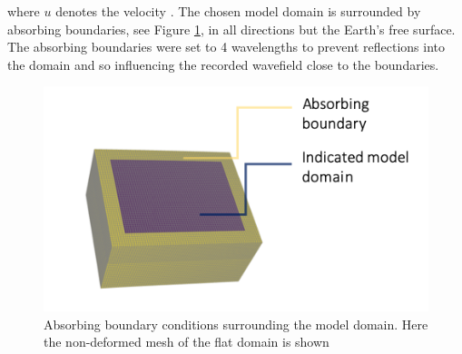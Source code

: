 \documentclass[../Text/00main.tex]{subfiles}
\begin{document}
where $u$ denotes the velocity \citet{igel_computational_2017}. The chosen model domain is surrounded by absorbing boundaries, see Figure \ref{fig:absb}, in all directions but the Earth's free surface. The absorbing boundaries were set to 4 wavelengths to prevent reflections into the domain and so influencing the recorded wavefield close to the boundaries. 

\begin{figure}
    \centering
    \includegraphics[width=.4\linewidth]{images_methods/absorbingboundaries.png}
    \caption{Absorbing boundary conditions surrounding the model domain. Here the non-deformed mesh of the flat domain is shown}
    \label{fig:absb}
\end{figure}

\begin{table}[]
\caption{Domain information. Number of points and elements vary per frequency for the Çubuk domain. }
\label{tab:domainparameters}
\end{table}
\end{document}
